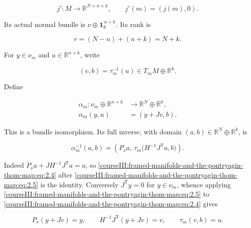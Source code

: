\begin{equation}
j':M\longrightarrow\mathbb R^{N+n+k},\qquad j'(m)=(j(m),0).
 \label{courseIII:framed-manifolds-and-the-pontryagin-thom-map:eq:2.1}
\end{equation}

Its actual normal bundle is \(\nu\oplus\mathbf1_{\mathbb R}^{\,n+k}\). Its rank is

\begin{equation}
r=(N-n)+(n+k)=N+k.
 \label{courseIII:framed-manifolds-and-the-pontryagin-thom-map:eq:2.2}
\end{equation}

For \(y\in\nu_m\) and \(u\in\mathbb R^{n+k}\), write

\begin{equation}
(v,b)=\tau_m^{-1}(u)\in T_mM\oplus\mathbb R^k.
 \label{courseIII:framed-manifolds-and-the-pontryagin-thom-map:eq:2.3}
\end{equation}

Define

\begin{equation}
\begin{aligned}
 \alpha_m:\nu_m\oplus\mathbb R^{n+k}&\longrightarrow
                                 \mathbb R^N\oplus\mathbb R^k,\\
 \alpha_m(y,u)&=(y+Jv,b).
 \end{aligned}
 \label{courseIII:framed-manifolds-and-the-pontryagin-thom-map:eq:2.4}
\end{equation}

This is a bundle isomorphism. Its full inverse, with domain
\((a,b)\in\mathbb R^N\oplus\mathbb R^k\), is

\begin{equation}
\alpha_m^{-1}(a,b)
    =\left(P_\nu a,\,
       \tau_m\bigl(H^{-1}J^{\mathsf T}a,b\bigr)\right).
 \label{courseIII:framed-manifolds-and-the-pontryagin-thom-map:eq:2.5}
\end{equation}

Indeed \(P_\nu a+JH^{-1}J^{\mathsf T}a=a\), so \eqref{courseIII:framed-manifolds-and-the-pontryagin-thom-map:eq:2.4} after \eqref{courseIII:framed-manifolds-and-the-pontryagin-thom-map:eq:2.5} is the identity. Conversely \(J^{\mathsf T}y=0\) for \(y\in\nu_m\), whence applying \eqref{courseIII:framed-manifolds-and-the-pontryagin-thom-map:eq:2.5} to \eqref{courseIII:framed-manifolds-and-the-pontryagin-thom-map:eq:2.4} gives

\begin{equation}
P_\nu(y+Jv)=y,\qquad
 H^{-1}J^{\mathsf T}(y+Jv)=v,\qquad
 \tau_m(v,b)=u.
 \label{courseIII:framed-manifolds-and-the-pontryagin-thom-map:eq:2.6}
\end{equation}

